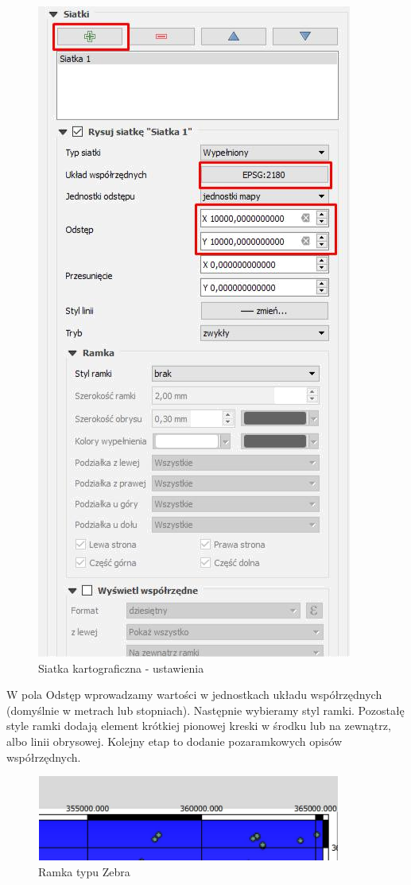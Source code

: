 \documentclass[12pt,a4paper]{book}
\begin{document}
\begin{center}
\begin{figure}
\includegraphics[width=10.372cm,height=21.643cm]{008-siatki.png}
\caption{Siatka kartograficzna - ustawienia}
\end{figure}
\end{center}
W pola Odstęp wprowadzamy wartości w jednostkach układu współrzędnych (domyślnie w metrach lub stopniach). Następnie wybieramy styl ramki. Pozostałę style ramki dodają element krótkiej pionowej kreski w środku lub na zewnątrz, albo linii obrysowej. Kolejny etap to dodanie pozaramkowych opisów współrzędnych.

\begin{center}
\begin{figure}
\includegraphics[width=9.998cm,height=2.808cm]{008-zebra.jpg}
\caption{Ramka typu Zebra}
\end{figure}
\end{center}
\end{document}
